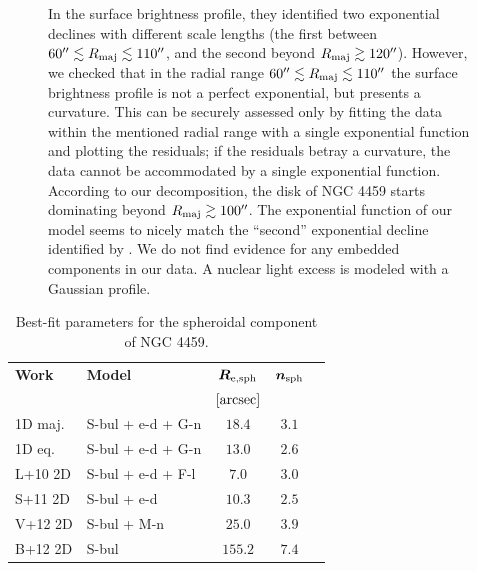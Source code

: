 \documentclass[preprint2]{emulateapj}
\begin{document}
\begin{figure}[h]
\begin{center}
{{  In the surface brightness profile, they identified two exponential declines with different scale lengths 
  (the first between $60'' \lesssim R_{\rm maj} \lesssim 110''$, and the second beyond $R_{\rm maj} \gtrsim 120''$). 
  However, we checked that in the radial range $60'' \lesssim R_{\rm maj} \lesssim 110''$ 
  the surface brightness profile is not a perfect exponential, but presents a curvature. 
  This can be securely assessed only by fitting the data within the mentioned radial range with a single exponential function 
  and plotting the residuals; 
  if the residuals betray a curvature, the data cannot be accommodated by a single exponential function. 
  According to our decomposition, the disk of NGC 4459 starts dominating beyond $R_{\rm maj} \gtrsim 100''$. 
  The exponential function of our model seems to nicely match the ``second'' exponential decline identified by \cite{gutierrez2011}.  }
  We do not find evidence for any embedded components in our data.
  A nuclear light excess is modeled with a Gaussian profile.
  }
  \end{center}
  \end{figure}

  \begin{table}[h]
  \small
  \caption{Best-fit parameters for the spheroidal component of NGC 4459.}
  \begin{center}
  \begin{tabular}{llccc}
  \hline
  {\bf Work} & {\bf Model}   & $\bm R_{\rm e,sph}$    & $\bm n_{\rm sph}$ \\
    &  &  $[\rm arcsec]$ & \\
  \hline
  1D maj. & S-bul + e-d + G-n & $18.4$  &  $3.1$ \\
  1D eq.  & S-bul + e-d + G-n & $13.0$  &  $2.6$ \\
  \hline
  L+10 2D      & S-bul + e-d + F-l & $7.0$   &  $3.0$ \\
  S+11 2D      & S-bul + e-d	& $10.3$  &  $2.5$ \\
  V+12 2D      & S-bul + M-n	& $25.0$  &  $3.9$ \\
  B+12 2D      & S-bul		& $155.2$ &  $7.4$ \\
  \hline
  \end{tabular}
  \end{center}
  \label{tab:n4459}
  \end{table}
\end{document}
